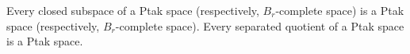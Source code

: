 Every closed subspace of a Ptak space (respectively, $B_r$-complete space) is a Ptak space (respectively, $B_r$-complete space). Every separated quotient of a Ptak space is a Ptak space.